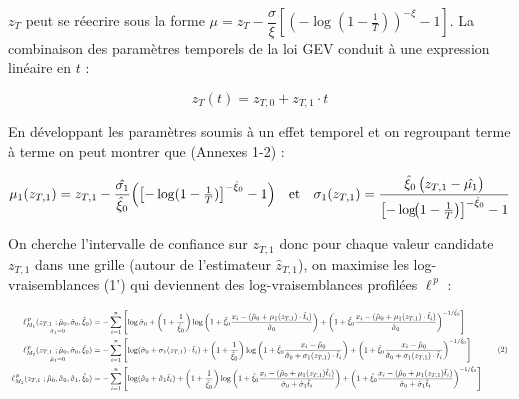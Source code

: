 \documentclass[
  article,
  nofooter,
  noheadings]{jss}
\begin{document}
\(z_T\) peut se réecrire sous la forme
\(\mu = z_T - \dfrac{\sigma}{\xi} \left[ \left( -\log\left(1 - \frac{1}{T} \right) \right)^{-\xi} - 1 \right]\).
La combinaison des paramètres temporels de la loi GEV conduit à une
expression linéaire en \(t\) :

\[
z_T(t) = z_{T,0} + z_{T,1} \cdot t
\]

En développant les paramètres soumis à un effet temporel et on
regroupant terme à terme on peut montrer que (Annexes 1-2) :

\[
\mu_1(z_{T,1}) = z_{T,1} -\dfrac{\hat{\sigma_1}}{\hat{\xi}_0}\Bigl(\bigl[-\log(1-\tfrac1T)\bigr]^{-\hat{\xi}_0}-1\Bigr) \quad \text{et} \quad
\sigma_1(z_{T,1}) = \dfrac{\hat{\xi}_0\,\bigl(z_{T,1}-\hat{\mu_1}\bigr)}{\bigl[-\log\!\bigl(1-\tfrac1T\bigr)\bigr]^{-\hat{\xi}_0}-1}
\]

On cherche l'intervalle de confiance sur \(z_{T,1}\) donc pour chaque
valeur candidate \(z_{T,1}\) dans une grille (autour de l'estimateur
\(\hat{z}_{T,1}\)), on maximise les log-vraisemblances (1') qui
deviennent des log-vraisemblances profilées \(\ell^{\,p}\) :

\[
\scalebox{0.7}{
\(
\begin{aligned}
\underset{\hat{\sigma}_1 = 0}{\ell_{M_1}^{\,p}(z_{T,1} \ ; \hat{\mu}_0, \hat{\sigma}_0, \hat{\xi}_0)} &= 
-\sum_{i=1}^n \left[
\log \hat{\sigma}_0 +
\left(1 + \frac{1}{\hat{\xi}_0} \right) \log \left(1 + \hat{\xi}_0 \frac{x_i - (\hat{\mu}_0 + \mu_1(z_{T,1}) \cdot \tilde{t}_i)}{\hat{\sigma}_0} \right) +
\left(1 + \hat{\xi}_0 \frac{x_i - (\hat{\mu}_0 + \mu_1(z_{T,1}) \cdot \tilde{t}_i)}{\hat{\sigma}_0} \right)^{-1/\hat{\xi}_0}
\right]\\
\underset{\hat{\mu}_1 = 0}{\ell_{M_2}^{\,p}(z_{T,1} \ ; \hat{\mu}_0, \hat{\sigma}_0, \hat{\xi}_0)} &= 
-\sum_{i=1}^n \left[
\log (\hat{\sigma}_0 + \sigma_1(z_{T,1}) \cdot \tilde{t}_i) +
\left(1 + \frac{1}{\hat{\xi}_0} \right) \log \left(1 + \hat{\xi}_0 \frac{x_i - \hat{\mu}_0}{\hat{\sigma}_0 + \sigma_1(z_{T,1}) \cdot \tilde{t}_i} \right) +
\left(1 + \hat{\xi}_0 \frac{x_i - \hat{\mu}_0}{\hat{\sigma}_0 + \sigma_1(z_{T,1}) \cdot \tilde{t}_i} \right)^{-1/\hat{\xi}_0}
\right]\\
\ell_{M_3}^{\,p}(z_{T,1} \ ; \hat{\mu}_0, \hat{\sigma}_0, \hat{\sigma}_1, \hat{\xi}_0) &= 
-\sum_{i=1}^n \left[
\log (\hat{\sigma}_0 + \hat{\sigma}_1 \tilde{t}_i) +
\left(1 + \frac{1}{\hat{\xi}_0} \right) \log \left(1 + \hat{\xi}_0 \frac{x_i - (\hat{\mu}_0 + \mu_1(z_{T,1}) \tilde{t}_i)}{\hat{\sigma}_0 + \hat{\sigma}_1 \tilde{t}_i} \right) +
\left(1 + \hat{\xi}_0 \frac{x_i - (\hat{\mu}_0 + \mu_1(z_{T,1}) \tilde{t}_i)}{\hat{\sigma}_0 + \hat{\sigma}_1 \tilde{t}_i} \right)^{-1/\hat{\xi}_0}
\right]\\
\end{aligned}
\tag{2}
\)
}
\]
\end{document}
